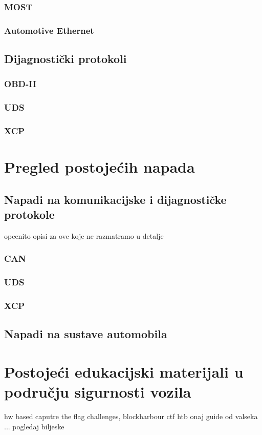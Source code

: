 \documentclass[times, utf8, diplomski, numeric]{fer}
\begin{document}
\subsection{MOST}
\subsection{Automotive Ethernet}
\section{Dijagnostički protokoli}
\subsection{OBD-II}
\subsection{UDS}
\subsection{XCP}

\chapter{Pregled postojećih napada}
\section{Napadi na komunikacijske i dijagnostičke protokole}
opcenito opisi za ove koje ne razmatramo u detalje
\subsection{CAN}
\subsection{UDS}
\subsection{XCP}
\section{Napadi na sustave automobila}
\chapter{Postojeći edukacijski materijali u području sigurnosti vozila}
hw based caputre the flag challenges,
blockharbour ctf
htb
onaj guide od valseka
... pogledaj biljeske
\end{document}
